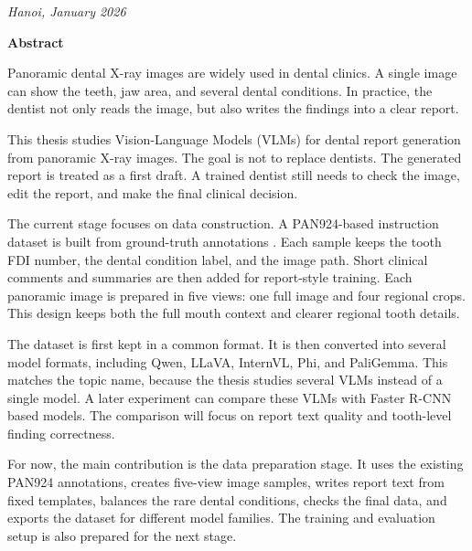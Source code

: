 \documentclass[a4paper,12pt]{report}
\begin{document}
\vfill

\begin{center}
    \textit{Hanoi, January 2026}
\end{center}
\newpage
\newpage








\begin{center}
    \textbf{\LARGE Abstract}

\end{center}

Panoramic dental X-ray images are widely used in dental clinics. A single image can show the teeth, jaw area, and several dental conditions. In practice, the dentist not only reads the image, but also writes the findings into a clear report.

This thesis studies Vision-Language Models (VLMs) for dental report generation from panoramic X-ray images. The goal is not to replace dentists. The generated report is treated as a first draft. A trained dentist still needs to check the image, edit the report, and make the final clinical decision.

The current stage focuses on data construction. A PAN924-based instruction dataset is built from ground-truth annotations \cite{inredd_pan924_2025}. Each sample keeps the tooth FDI number, the dental condition label, and the image path. Short clinical comments and summaries are then added for report-style training. Each panoramic image is prepared in five views: one full image and four regional crops. This design keeps both the full mouth context and clearer regional tooth details.

The dataset is first kept in a common format. It is then converted into several model formats, including Qwen, LLaVA, InternVL, Phi, and PaliGemma. This matches the topic name, because the thesis studies several VLMs instead of a single model. A later experiment can compare these VLMs with Faster R-CNN based models. The comparison will focus on report text quality and tooth-level finding correctness.

For now, the main contribution is the data preparation stage. It uses the existing PAN924 annotations, creates five-view image samples, writes report text from fixed templates, balances the rare dental conditions, checks the final data, and exports the dataset for different model families. The training and evaluation setup is also prepared for the next stage.
 
\end{document}
